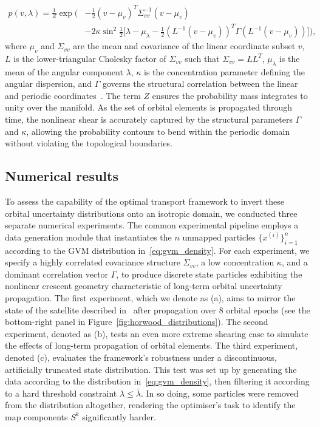 \begin{equation} \label{eq:gvm_density}
\begin{aligned}
    p(v, \lambda) = \frac{1}{Z} \exp\Biggl( &-\frac{1}{2} (v - \mu_v)^T \Sigma_{vv}^{-1} (v - \mu_v) \\ 
    &- 2\kappa \sin^2\frac{1}{2}\big[\lambda - \mu_\lambda - \frac{1}{2}(L^{-1}(v - \mu_v))^T\Gamma (L^{-1}(v - \mu_v))\big] \Biggr),
\end{aligned}
\end{equation}
where $\mu_v$ and $\Sigma_{vv}$ are the mean and covariance of the linear coordinate subset $v$, $L$ is the lower-triangular Cholesky factor of $\Sigma_{vv}$ such that $\Sigma_{vv} = LL^T$,  $\mu_\lambda$ is the mean of the angular component $\lambda$, $\kappa$ is the concentration parameter defining the angular dispersion, and $\Gamma$ governs the structural correlation between the linear and periodic coordinates~\cite{Horwood2014}. The term $Z$ ensures the probability mass integrates to unity over the manifold. As the set of orbital elements is propagated through time, the nonlinear shear is accurately captured by the structural parameters $\Gamma$ and $\kappa$, allowing the probability contours to bend within the periodic domain without violating the topological boundaries.

\subsection{Numerical results} \label{subsec:gvm_numerical_results}

To assess the capability of the optimal transport framework to invert these orbital uncertainty distributions onto an isotropic domain, we conducted three separate numerical experiments. The common experimental pipeline employs a data generation module that instantiates the $n$ unmapped particles $\{x^{(i)}\}_{i=1}^n$ according to the GVM distribution in~\eqref {eq:gvm_density}. For each experiment, we specify a highly correlated covariance structure $\Sigma_{vv}$, a low concentration $\kappa$, and a dominant correlation vector $\Gamma$, to produce discrete state particles exhibiting the nonlinear crescent geometry characteristic of long-term orbital uncertainty propagation. The first experiment, which we denote as (a), aims to mirror the state of the satellite described in~\cite{Horwood2014} after propagation over 8 orbital epochs (see the bottom-right panel in Figure~\ref{fig:horwood_distributions}). The second experiment, denoted as (b), tests an even more extreme shearing case to simulate the effects of long-term propagation of orbital elements. The third experiment, denoted (c), evaluates the framework's robustness under a discontinuous, artificially truncated state distribution. This test was set up by generating the data according to the distribution in~\eqref {eq:gvm_density}, then filtering it according to a hard threshold constraint $\lambda \leq \bar{\lambda}$. In so doing, some particles were removed from the distribution altogether, rendering the optimiser's task to identify the map components $S^k$ significantly harder.

